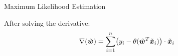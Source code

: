 \begin{frame}{Maximum Likelihood Estimation}
\medskip

After solving the derivative:
\begin{align*}
    \nabla(\tilde{{\boldsymbol w}}) & = 
     \sum_{i=1}^n \bigl(y_i - \theta(\tilde{{\boldsymbol w}}^T\tilde{{\boldsymbol x}}_i)\bigr) \cdot \tilde{{\boldsymbol x}}_i
\end{align*}
\end{frame}

